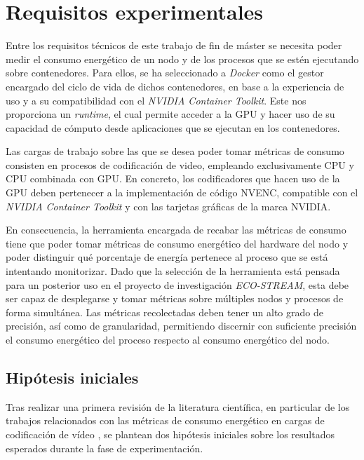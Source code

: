 \section{Requisitos experimentales}\label{sect:requisitos-alcance-experimental}
Entre los requisitos técnicos de este trabajo de fin de máster se necesita poder medir el consumo energético de un nodo y de los procesos que se estén ejecutando sobre contenedores. Para ellos, se ha seleccionado a \textit{Docker} como el gestor encargado del ciclo de vida de dichos contenedores, en base a la experiencia de uso y a su compatibilidad con el \textit{NVIDIA Container Toolkit}. Este nos proporciona un \textit{runtime}, el cual permite acceder a la GPU y hacer uso de su capacidad de cómputo desde aplicaciones que se ejecutan en los contenedores.

Las cargas de trabajo sobre las que se desea poder tomar métricas de consumo consisten en procesos de codificación de video, empleando exclusivamente CPU y CPU combinada con GPU. En concreto, los codificadores que hacen uso de la GPU deben pertenecer a la implementación de código NVENC, compatible con el \textit{NVIDIA Container Toolkit} y con las tarjetas gráficas de la marca NVIDIA.

En consecuencia, la herramienta encargada de recabar las métricas de consumo tiene que poder tomar métricas de consumo energético del hardware del nodo y poder distinguir qué porcentaje de energía pertenece al proceso que se está intentando monitorizar. Dado que la selección de la herramienta está pensada para un posterior uso en el proyecto de investigación \textit{ECO-STREAM}, esta debe ser capaz de desplegarse y tomar métricas sobre múltiples nodos y procesos de forma simultánea. Las métricas recolectadas deben tener un alto grado de precisión, así como de granularidad, permitiendo discernir con suficiente precisión el consumo energético del proceso respecto al consumo energético del nodo. 

\subsection{Hipótesis iniciales} \label{subsec:hipotesis}
 Tras realizar una primera revisión de la literatura científica, en particular de los trabajos relacionados con las métricas de consumo energético en cargas de codificación de vídeo \cite{survery-videoencoding} \cite{rapl-tool} \cite{energy-rapl-mesurement}, se plantean dos hipótesis iniciales sobre los resultados esperados durante la fase de experimentación. 

